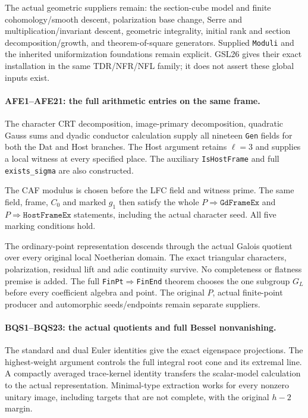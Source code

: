 The actual geometric suppliers remain: the section-cube model and
finite cohomology/smooth descent, polarization base change, Serre
and multiplication/invariant descent, geometric integrality, initial rank and section
decomposition/growth, and theorem-of-square generators. Supplied
\texttt{Moduli} and the inherited uniformization foundations remain
explicit. GSL26 gives their exact installation in the same
TDR/NFR/NFL family; it does not assert these global inputs exist.

\paragraph{AFE1--AFE21: the full arithmetic entries on the same frame.}
The character CRT decomposition, image-primary decomposition,
quadratic Gauss sums and dyadic conductor calculation supply all
nineteen \texttt{Gen} fields for both the Dat and Host branches.
The Host argument retains $\ell=3$ and supplies a local witness
at every specified place. The auxiliary \texttt{IsHostFrame}
and full \texttt{exists\_sigma} are also constructed.

The CAF modulus is chosen before the LFC field and witness prime.
The same field, frame, $C_0$ and marked $g_1$ then satisfy the
whole $P\Rightarrow\texttt{GdFrameEx}$ and
$P\Rightarrow\texttt{HostFrameEx}$ statements, including the
actual character seed. All five marking conditions hold.

The ordinary-point representation descends through the actual
Galois quotient over every original local Noetherian domain.
The exact triangular characters, polarization, residual lift and
adic continuity survive. No completeness or flatness premise is
added. The full \texttt{FinPt}\!$\Rightarrow$\!\texttt{FinEnd}
theorem chooses the one subgroup $G_L$ before every coefficient
algebra and point. The original $P$, actual finite-point producer
and automorphic seeds/endpoints remain separate suppliers.

\paragraph{BQS1--BQS23: the actual quotients and full Bessel nonvanishing.}
The standard and dual Euler identities give the exact eigenspace
projections. The highest-weight argument controls the full integral
root cone and its extremal line. A compactly averaged trace-kernel
identity transfers the scalar-model calculation to the actual
representation. Minimal-type extraction works for every nonzero
unitary image, including targets that are not complete, with the
original $h-2$ margin.

